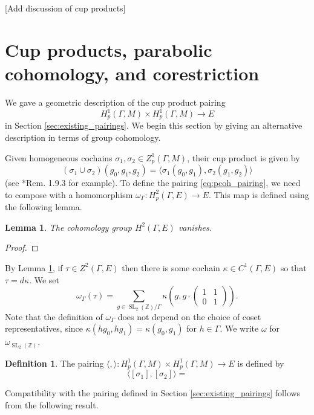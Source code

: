 \documentclass[10pt]{amsart}
\theoremstyle{plain}
\newtheorem{lemma}[theorem]{Lemma}
\theoremstyle{definition}
\newtheorem{definition}[theorem]{Definition}
\newcommand{\ZZ}{{\mathbb{Z}}}
\DeclareMathOperator{\SL}{SL}
\begin{document}
[Add discussion of cup products]


\section{Cup products, parabolic cohomology, and corestriction}

We gave a geometric description of the cup product pairing
\begin{equation} \label{eq:pcoh_pairing}
H^1_p(\Gamma, M) \times H^1_p(\Gamma, M) \to E
\end{equation}
in Section \ref{sec:existing_pairings}.  We begin this section by giving an alternative description in terms of group cohomology.

Given homogeneous cochains $\sigma_1, \sigma_2 \in Z^1_p(\Gamma, M)$, their cup product is given by
\[
(\sigma_1 \cup \sigma_2)(g_0, g_1, g_2) = \langle \sigma_1(g_0, g_1), \sigma_2(g_1, g_2) \rangle
\]
(see \cite{Sharifi}*{Rem. 1.9.3} for example). To define the pairing \eqref{eq:pcoh_pairing}, we need to compose with a homomorphism $\omega_\Gamma : H^2_p(\Gamma, E) \to E$.  This map is defined using the following lemma.

\begin{lemma} \label{lem:H2E}
The cohomology group $H^2(\Gamma, E)$ vanishes.
\end{lemma}
\begin{proof}

\end{proof}

By Lemma \ref{lem:H2E}, if $\tau \in Z^2(\Gamma, E)$ then there is some cochain $\kappa \in C^1(\Gamma, E)$ so that $\tau = d\kappa$.  We set
\[
\omega_\Gamma(\tau) = \sum_{g \in \SL_2(\ZZ) / \Gamma} \kappa\left(g, g \cdot \left(\begin{smallmatrix} 1 & 1 \\ 0 & 1 \end{smallmatrix}\right)\right).
\]
Note that the definition of $\omega_\Gamma$ does not depend on the choice of coset representatives, since $\kappa(hg_0, hg_1) = \kappa(g_0, g_1)$ for $h \in \Gamma$.  We write $\omega$ for $\omega_{\SL_2(\ZZ)}$.  

\begin{definition}
The pairing $\langle , \rangle : H^1_p(\Gamma, M) \times H^1_p(\Gamma, M) \to E$ is defined by
\[
\langle [\sigma_1], [\sigma_2] \rangle =
\]
\end{definition}
Compatibility with the pairing defined in Section \ref{sec:existing_pairings} follows from the following result.
\end{document}
